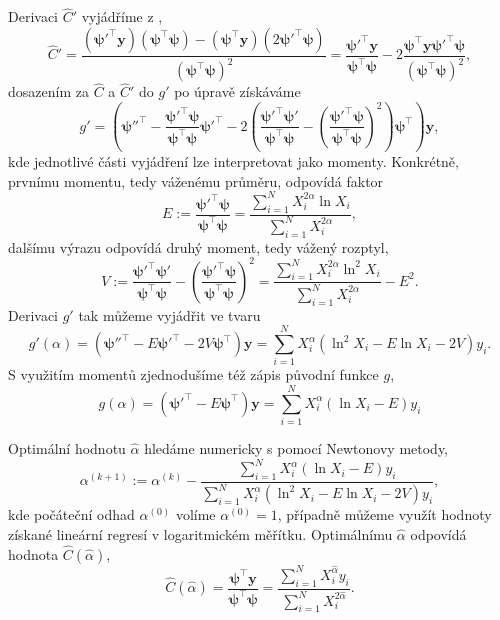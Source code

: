 Derivaci $\hat{C}'$ vyjádříme z ,
\begin{equation}
    \hat{C}'=\frac{(\bm{\psi}'^\top\bm{y})(\bm{\psi}^\top\bm{\psi})-(\bm{\psi}^\top\bm{y})(2\bm{\psi}'^\top\bm{\psi})}{(\bm{\psi}^\top\bm{\psi})^2}
    =\frac{\bm{\psi'}^\top\bm{y}}{\bm{\psi}^\top\bm{\psi}}-2\frac{\bm{\psi}^\top\bm{y}\bm{\psi}'^\top\bm{\psi}}{(\bm{\psi}^\top\bm{\psi})^2},
\end{equation}
dosazením za $\hat{C}$ a $\hat{C}'$ do $g'$ po úpravě získáváme
\begin{equation}
    g'=\left(\bm{\psi}''^\top-\frac{\bm{\psi}'^\top\bm{\psi}}{\bm{\psi}^\top\bm{\psi}}\bm{\psi'}^\top-2\left(\frac{\bm{\psi}'^\top\bm{\psi}'}{\bm{\psi}^\top\bm{\psi}}-\left(\frac{\bm{\psi}'^\top\bm{\psi}}{\bm{\psi}^\top\bm{\psi}}\right)^2\right)\bm{\psi}^\top\right)\bm{y},
\end{equation}
kde jednotlivé části vyjádření lze interpretovat jako momenty. Konkrétně, prvnímu momentu, tedy váženému průměru, odpovídá faktor
\begin{equation}
    E:=\frac{\bm{\psi}'^\top\bm{\psi}}{\bm{\psi}^\top\bm{\psi}}=\frac{\sum_{i=1}^{N}X_i^{2\alpha}\ln{X_i}}{\sum_{i=1}^N{X_i^{2\alpha}}},
\end{equation}
dalšímu výrazu odpovídá druhý moment, tedy vážený rozptyl,
\begin{equation}
    V:=\frac{\bm{\psi}'^\top\bm{\psi}'}{\bm{\psi}^\top\bm{\psi}}-\left(\frac{\bm{\psi}'^\top\bm{\psi}}{\bm{\psi}^\top\bm{\psi}}\right)^2=\frac{\sum_{i=1}^{N}X_i^{2\alpha}\ln^2{\!{X_i}}}{\sum_{i=1}^{N}X_i^{2\alpha}}-E^2.
\end{equation}
Derivaci $g'$ tak můžeme vyjádřit ve tvaru
\begin{equation}
    g'(\alpha)=(\bm{\psi}''^\top-E\bm{\psi}'^\top-2V\bm{\psi}^\top)\bm{y}=\sum_{i=1}^{N}X_i^\alpha\left(\ln^2{\!X_i}-E\ln{X_i}-2V\right)y_i.
\end{equation}
S využitím momentů zjednodušíme též zápis původní funkce $g$,
\begin{equation}
    g(\alpha)=\left(\bm{\psi}'^\top-E\bm{\psi}^\top\right)\bm{y}=\sum_{i=1}^{N}X_i^\alpha(\ln{X_i}-E)y_i
\end{equation}

Optimální hodnotu $\hat{\alpha}$ hledáme numericky s pomocí Newtonovy metody,
\begin{equation}
    \alpha^{(k+1)}:=\alpha^{(k)}-\frac{\sum_{i=1}^{N}X_i^\alpha(\ln{X_i}-E)y_i}{\sum_{i=1}^{N}X_i^\alpha\left(\ln^2{\!X_i}-E\ln{X_i}-2V\right)y_i},
\end{equation}
kde počáteční odhad $\alpha^{(0)}$ volíme $\alpha^{(0)}=1$, případně můžeme využít hodnoty získané lineární regresí v logaritmickém měřítku. Optimálnímu $\hat{\alpha}$ odpovídá hodnota $\hat{C}(\hat{\alpha})$,
\begin{equation}
    \hat{C}(\hat{\alpha})=\frac{\bm{\psi}^\top\bm{y}}{\bm{\psi}^\top\bm{\psi}}=\frac{\sum_{i=1}^{N}X_i^{\hat{\alpha}}y_i}{\sum_{i=1}^{N}X_i^{2\hat{\alpha}}}.
\end{equation}



